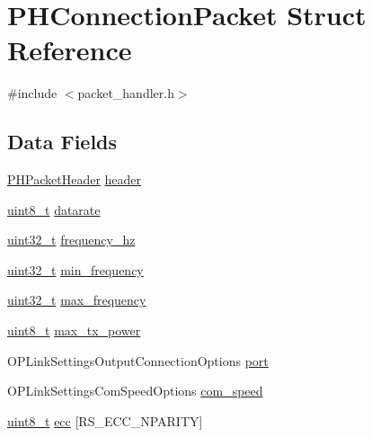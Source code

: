 \hypertarget{struct_p_h_connection_packet}{\section{P\-H\-Connection\-Packet Struct Reference}
\label{struct_p_h_connection_packet}
}


{\ttfamily \#include $<$packet\-\_\-handler.\-h$>$}

\subsection*{Data Fields}
\begin{DoxyCompactItemize}
\item 
\hyperlink{struct_p_h_packet_header}{P\-H\-Packet\-Header} \hyperlink{struct_p_h_connection_packet_a52261a934b08802064ddd177d22f5a1b}{header}
\item 
\hyperlink{stdint_8h_aba7bc1797add20fe3efdf37ced1182c5}{uint8\-\_\-t} \hyperlink{struct_p_h_connection_packet_ac0efb46843892dc7b42a503eeea6d58c}{datarate}
\item 
\hyperlink{stdint_8h_a435d1572bf3f880d55459d9805097f62}{uint32\-\_\-t} \hyperlink{struct_p_h_connection_packet_a50a68f68b6f7f8d07f91f9076d638dbd}{frequency\-\_\-hz}
\item 
\hyperlink{stdint_8h_a435d1572bf3f880d55459d9805097f62}{uint32\-\_\-t} \hyperlink{struct_p_h_connection_packet_a4e11c88e3be1dbcacc324aace217b7e6}{min\-\_\-frequency}
\item 
\hyperlink{stdint_8h_a435d1572bf3f880d55459d9805097f62}{uint32\-\_\-t} \hyperlink{struct_p_h_connection_packet_a607b2aff285e735c41dee293f8144be0}{max\-\_\-frequency}
\item 
\hyperlink{stdint_8h_aba7bc1797add20fe3efdf37ced1182c5}{uint8\-\_\-t} \hyperlink{struct_p_h_connection_packet_aaeff460e39a62242df16ffce090b0760}{max\-\_\-tx\-\_\-power}
\item 
O\-P\-Link\-Settings\-Output\-Connection\-Options \hyperlink{struct_p_h_connection_packet_ae3b874c83f519f62b7ee56a805c527d5}{port}
\item 
O\-P\-Link\-Settings\-Com\-Speed\-Options \hyperlink{struct_p_h_connection_packet_aba21090aa4d393dc1d6e85406efa1c4b}{com\-\_\-speed}
\item 
\hyperlink{stdint_8h_aba7bc1797add20fe3efdf37ced1182c5}{uint8\-\_\-t} \hyperlink{struct_p_h_connection_packet_a047b7d5ea9d5699d06966d96ef4ccfba}{ecc} \mbox{[}R\-S\-\_\-\-E\-C\-C\-\_\-\-N\-P\-A\-R\-I\-T\-Y\mbox{]}
\end{DoxyCompactItemize}


